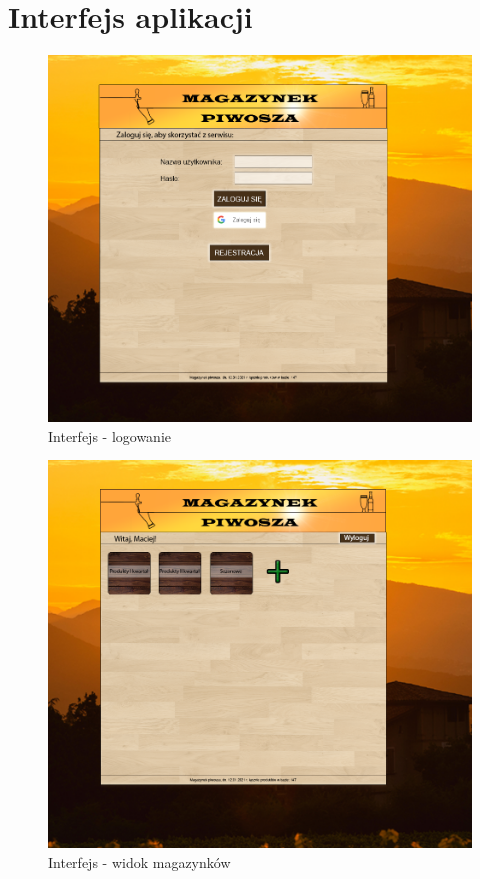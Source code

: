 \documentclass[12pt,a4paper]{article}
\begin{document}
	\section{Interfejs aplikacji}
		\begin{figure}[H]
			\centering
			\includegraphics[width=\textwidth]{img/interfejs1.png}
			\caption{Interfejs - logowanie}
			\label{fig:int-log}
		\end{figure}
		\begin{figure}[H]
			\centering
			\includegraphics[width=\textwidth]{img/interfejs2.png}
			\caption{Interfejs - widok magazynków}
			\label{fig:int-mag-list}
		\end{figure}
\end{document}
